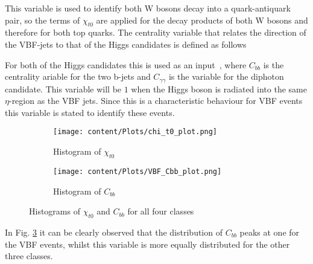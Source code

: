 
This variable is used to identify both W bosons decay into a quark-antiquark pair, so the terms of $\chi_{t0}$ are applied for the decay products of both W bosons and therefore for both top quarks.
The centrality variable that relates the direction of the VBF-jets to that of the Higgs candidates is defined as follows


For both of the Higgs candidates this is used as an input~\cite{CMS:2021qbp}, where $C_{bb}$ is the centrality ariable for the two b-jets and $C_{\gamma \gamma}$ is the variable for the diphoton candidate.
This variable will be $1$ when the Higgs boson is radiated into the same $\eta$-region as the VBF jets. Since this is a characteristic
behaviour for VBF events this variable is stated to identify these events. \\

\begin{figure}[H]
    \centering
    \begin{subfigure}{0.45\textwidth}
        \centering
        \texttt{[image: content/Plots/chi\_t0\_plot.png]}
        \caption{Histogram of $\chi_{t0}$}
        \label{fig:roc1}
    \end{subfigure}
    \hfill
    \begin{subfigure}{0.45\textwidth}
        \centering
        \texttt{[image: content/Plots/VBF\_Cbb\_plot.png]}
        \caption{Histogram of $C_{bb}$}
        \label{fig:roc2}
    \end{subfigure}
    \caption{Histograms of $\chi_{t0}$ and $C_{bb}$ for all four classes}
    \label{fig:22}
\end{figure}

In Fig. \ref{fig:22} it can be clearly observed that the distribution of $C_{bb}$ peaks at one for the VBF events, whilst this variable is more equally distributed for the other three classes.
